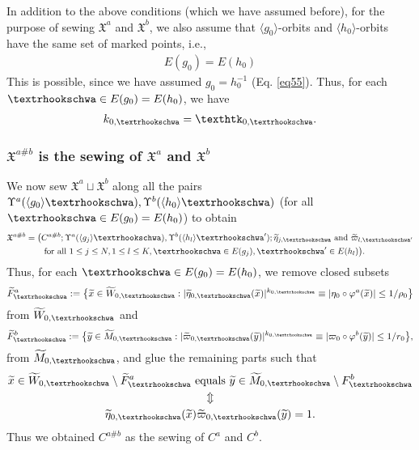 \documentclass[11pt,b5paper,notitlepage]{article}
\theoremstyle{definition}
\theoremstyle{plain}
\newcommand{\fk}{\mathfrak}
\newcommand{\wtd}{\widetilde}
\newcommand{\bk}[1]{\langle {#1}\rangle}
\newcommand{\tipae}{\text{\textrhookschwa}}
\newcommand{\tipak}{\text{\texthtk}}
\numberwithin{equation}{subsection}
\begin{document}
In addition to the above conditions (which we have assumed before), for the purpose of sewing $\fk X^a$ and $\fk X^b$, we also assume that $\bk{g_0}$-orbits and $\bk{h_0}$-orbits have the same set of marked points, i.e.,
\begin{align}
\boxed{~E(g_0)=E(h_0)~}
\end{align} 
This is possible, since we have assumed $g_0=h_0^{-1}$ (Eq. \eqref{eq55}). Thus, for each $\tipae\in E(g_0)=E(h_0)$, we have
\begin{align*}
k_{0,\tipae}=\tipak_{0,\tipae}.	
\end{align*}



\subsubsection{$\fk X^{a\#b}$ is the sewing of $\fk X^a$ and $\fk X^b$}\label{lb43}



We now sew $\fk X^a\sqcup\fk X^b$ along all the pairs $\Upsilon^a(\bk{g_0}\tipae),\Upsilon^b(\bk{h_0}\tipae)$ (for all $\tipae\in E(g_0)=E(h_0)$) to obtain
\begin{align*}
\fk X^{a\#b}=	\big(&C^{a\#b};\Upsilon^a(\bk{g_j}\tipae),\Upsilon^b(\bk{h_l}\tipae');\wtd\eta_{j,\tipae}\text{ and }\wtd\varpi_{l,\tipae'}\nonumber\\
&\text{ for all }1\leq j\leq N,1\leq l\leq K,\tipae\in E(g_j),\tipae'\in E(h_l)\big).	
\end{align*}
Thus, for each $\tipae\in E(g_0)=E(h_0)$, we remove closed subsets
\begin{align*}
\wtd F_\tipae^a:=\big\{\wtd x\in\wtd W_{0,\tipae}:|\wtd\eta_{0,\tipae}(\wtd x)|^{k_{0,\tipae}}\equiv|\eta_0\circ\varphi^a(\wtd x)|\leq 1/\rho_0\big\}
\end{align*}
from $\wtd W_{0,\tipae}$ and 
\begin{align*}
\wtd F_\tipae^b:=\big\{\wtd y\in\wtd M_{0,\tipae}:|\wtd\varpi_{0,\tipae}(\wtd y)|^{k_{0,\tipae}}\equiv|\varpi_0\circ\varphi^b(\wtd y)|\leq 1/r_0\big\},
\end{align*}
from $\wtd M_{0,\tipae}$, and glue the remaining parts such that
\begin{gather*}
\wtd x\in \wtd W_{0,\tipae}\setminus \wtd F_\tipae^a\text{ equals }\wtd y\in \wtd M_{0,\tipae}\setminus F_\tipae^b\\
\Updownarrow\\
\wtd \eta_{0,\tipae}(\wtd x)\wtd\varpi_{0,\tipae}(\wtd y)=1.
\end{gather*}
Thus we obtained $C^{a\#b}$ as the sewing of $C^a$ and $C^b$.
\end{document}
